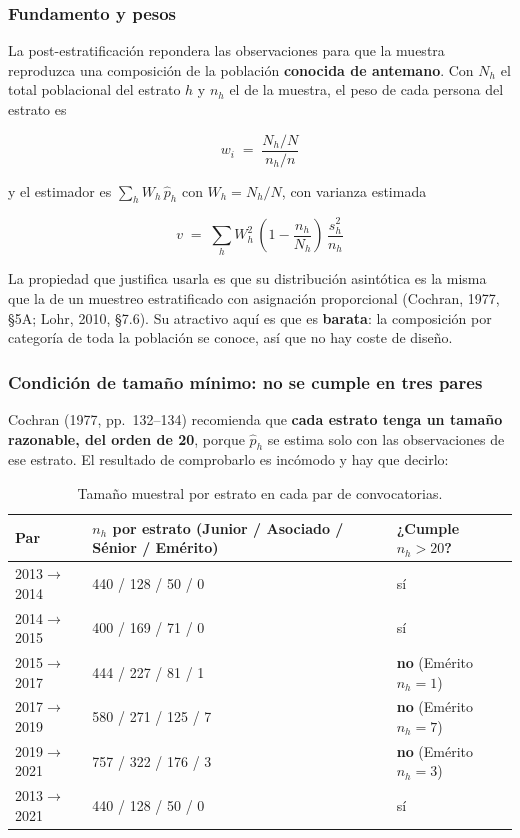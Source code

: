 \subsubsection{Fundamento y pesos}

La post-estratificación repondera las observaciones para que la muestra
reproduzca una composición de la población \textbf{conocida de antemano}. Con
$N_h$ el total poblacional del estrato $h$ y $n_h$ el de la muestra, el peso de
cada persona del estrato es

\begin{equation}
  w_i \;=\; \frac{N_h/N}{n_h/n}
  \label{eq:mues-pesos}
\end{equation}

y el estimador es $\sum_h W_h\,\hat{p}_h$ con $W_h = N_h/N$, con varianza
estimada

\begin{equation}
  v \;=\; \sum_h W_h^2\,\left(1 - \frac{n_h}{N_h}\right)\,\frac{s_h^2}{n_h}
  \label{eq:mues-varianza}
\end{equation}

La propiedad que justifica usarla es que su distribución asintótica es la misma
que la de un muestreo estratificado con asignación proporcional (Cochran, 1977,
§5A; Lohr, 2010, §7.6). Su atractivo aquí es que es \textbf{barata}: la
composición por categoría de toda la población se conoce, así que no hay coste de
diseño.

\subsubsection{Condición de tamaño mínimo: no se cumple en tres pares}

Cochran (1977, pp.~132--134) recomienda que \textbf{cada estrato tenga un tamaño
razonable, del orden de 20}, porque $\hat{p}_h$ se estima solo con las
observaciones de ese estrato. El resultado de comprobarlo es incómodo y hay que
decirlo:

\begin{table}[H]
  \centering
  \small
  \caption{Tamaño muestral por estrato en cada par de convocatorias.}
  \label{tab:mues-tamano-estrato}
  \begin{tabular}{@{}lp{6.6cm}l@{}}
    \toprule
    \textbf{Par} & \textbf{$n_h$ por estrato (Junior / Asociado / Sénior / Emérito)}
      & \textbf{¿Cumple $n_h > 20$?} \\
    \midrule
    2013$\rightarrow$2014 & 440 / 128 / 50 / 0 & sí \\
    2014$\rightarrow$2015 & 400 / 169 / 71 / 0 & sí \\
    2015$\rightarrow$2017 & 444 / 227 / 81 / 1 & \textbf{no} (Emérito $n_h = 1$) \\
    2017$\rightarrow$2019 & 580 / 271 / 125 / 7 & \textbf{no} (Emérito $n_h = 7$) \\
    2019$\rightarrow$2021 & 757 / 322 / 176 / 3 & \textbf{no} (Emérito $n_h = 3$) \\
    2013$\rightarrow$2021 & 440 / 128 / 50 / 0 & sí \\
    \bottomrule
  \end{tabular}
\end{table}

